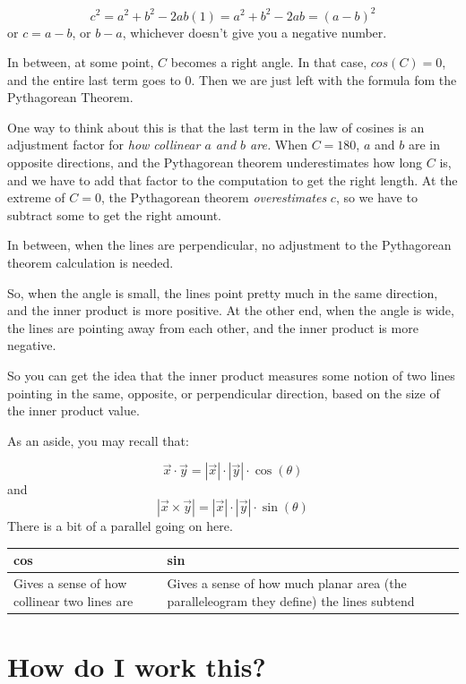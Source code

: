 \documentclass[
]{book}
\begin{document}
\[c^2 = a^2 + b^2 - 2 a b (1) = a^2 + b^2 - 2 a b = (a - b)^2\]
or \(c = a - b\), or \(b - a\), whichever doesn't give you a negative number.

In between, at some point, \(C\) becomes a right angle. In that case, \(cos(C) = 0\), and the entire last term goes to 0. Then we are just left with the formula fom the Pythagorean Theorem.

One way to think about this is that the last term in the law of cosines is an adjustment factor for \emph{how collinear \(a\) and \(b\) are.} When \(C = 180\), \(a\) and \(b\) are in opposite directions, and the Pythagorean theorem underestimates how long \(C\) is, and we have to add that factor to the computation to get the right length. At the extreme of \(C = 0\), the Pythagorean theorem \emph{overestimates} \(c\), so we have to subtract some to get the right amount.

In between, when the lines are perpendicular, no adjustment to the Pythagorean theorem calculation is needed.

So, when the angle is small, the lines point pretty much in the same direction, and the inner product is more positive. At the other end, when the angle is wide, the lines are pointing away from each other, and the inner product is more negative.

So you can get the idea that the inner product measures some notion of two lines pointing in the same, opposite, or perpendicular direction, based on the size of the inner product value.

As an aside, you may recall that:

\[\vec{x} \cdot \vec{y} = |\vec{x}| \cdot |\vec{y}| \cdot \cos(\theta)\]
and
\[|\vec{x} \times \vec{y}| = |\vec{x}| \cdot |\vec{y}| \cdot \sin(\theta)\]
There is a bit of a parallel going on here.

\begin{longtable}[]{@{}
  >{\raggedright\arraybackslash}p{}
  >{\raggedright\arraybackslash}p{}@{}}
\toprule
cos & sin \\
\midrule
\endhead
Gives a sense of how collinear two lines are & Gives a sense of how much planar area (the paralleleogram they define) the lines subtend \\
\bottomrule
\end{longtable}

\hypertarget{how-do-i-work-this}{%
\chapter{How do I work this?}\label{how-do-i-work-this}}
\end{document}
